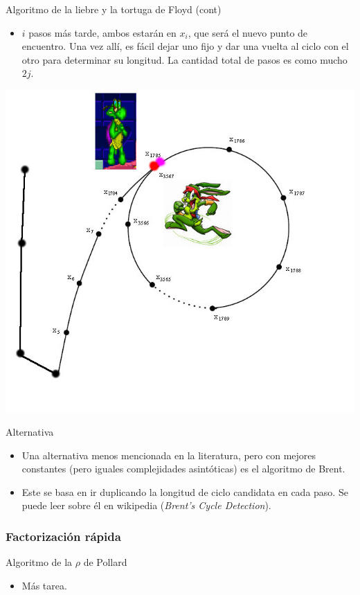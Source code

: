 \documentclass{beamer}
\begin{document}
\begin{frame}{Algoritmo de la liebre y la tortuga de Floyd (cont)}
    \begin{itemize}
    \item $i$ pasos más tarde, ambos estarán en $x_i$, que será el nuevo punto de encuentro. Una vez allí, es fácil dejar uno fijo y dar una vuelta al ciclo con el otro para determinar su longitud. La cantidad total de pasos es como mucho $2j$.
    \end{itemize}
    {\hfill \includegraphics[scale=0.35]{hare_tortoise_rho_cycle4.jpg} \hfill}
\end{frame}

\begin{frame}{Alternativa}
    \begin{itemize}
    \item Una alternativa menos mencionada en la literatura, pero con mejores constantes (pero iguales complejidades asintóticas) es el algoritmo de Brent.
    \item Este se basa en ir duplicando la longitud de ciclo candidata en cada paso. Se puede leer sobre él en wikipedia (\textit{Brent's Cycle Detection}).
    \end{itemize}
\end{frame}

\subsubsection{Factorización rápida}

\begin{frame}{Algoritmo de la $\rho$ de Pollard}
    \begin{itemize}
      \item Más tarea.
    \end{itemize}
\end{frame}
\end{document}
